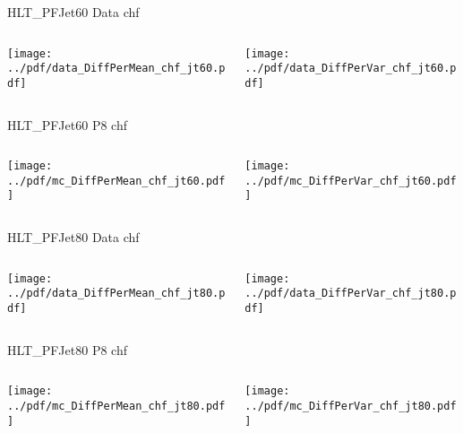 \documentclass[9pt]{beamer}
\begin{document}
\begin{frame}[t]{HLT\_PFJet60 Data chf}
\begin{columns}[T]
  \begin{column}{.5\textwidth}
  \texttt{[image: ../pdf/data\_DiffPerMean\_chf\_jt60.pdf]}
  \end{column}
  \begin{column}{.5\textwidth}
  \texttt{[image: ../pdf/data\_DiffPerVar\_chf\_jt60.pdf]}
  \end{column}
\end{columns}
\end{frame}

\begin{frame}[t]{HLT\_PFJet60 P8 chf}
\begin{columns}[T]
  \begin{column}{.5\textwidth}
  \texttt{[image: ../pdf/mc\_DiffPerMean\_chf\_jt60.pdf]}
  \end{column}
  \begin{column}{.5\textwidth}
  \texttt{[image: ../pdf/mc\_DiffPerVar\_chf\_jt60.pdf]}
  \end{column}
\end{columns}
\end{frame}

\begin{frame}[t]{HLT\_PFJet80 Data chf}
\begin{columns}[T]
  \begin{column}{.5\textwidth}
  \texttt{[image: ../pdf/data\_DiffPerMean\_chf\_jt80.pdf]}
  \end{column}
  \begin{column}{.5\textwidth}
  \texttt{[image: ../pdf/data\_DiffPerVar\_chf\_jt80.pdf]}
  \end{column}
\end{columns}
\end{frame}

\begin{frame}[t]{HLT\_PFJet80 P8 chf}
\begin{columns}[T]
  \begin{column}{.5\textwidth}
  \texttt{[image: ../pdf/mc\_DiffPerMean\_chf\_jt80.pdf]}
  \end{column}
  \begin{column}{.5\textwidth}
  \texttt{[image: ../pdf/mc\_DiffPerVar\_chf\_jt80.pdf]}
  \end{column}
\end{columns}
\end{frame}
\end{document}
